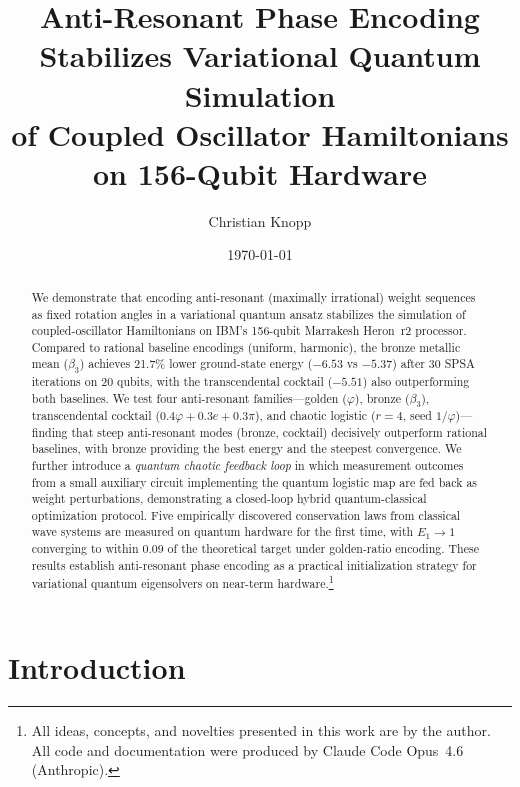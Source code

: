 \documentclass[twocolumn,showpacs,preprintnumbers,amsmath,amssymb,aps,prl]{revtex4-2}
\begin{document}

\title{Anti-Resonant Phase Encoding Stabilizes Variational Quantum Simulation\\of Coupled Oscillator Hamiltonians on 156-Qubit Hardware}

\author{Christian Knopp}

\date{\today}

\begin{abstract}
We demonstrate that encoding anti-resonant (maximally irrational) weight sequences as fixed rotation angles in a variational quantum ansatz stabilizes the simulation of coupled-oscillator Hamiltonians on IBM's 156-qubit Marrakesh Heron~r2 processor. Compared to rational baseline encodings (uniform, harmonic), the bronze metallic mean ($\beta_3$) achieves 21.7\% lower ground-state energy ($-6.53$ vs $-5.37$) after 30 SPSA iterations on 20 qubits, with the transcendental cocktail ($-5.51$) also outperforming both baselines. We test four anti-resonant families---golden ($\varphi$), bronze ($\beta_3$), transcendental cocktail ($0.4\varphi + 0.3e + 0.3\pi$), and chaotic logistic ($r\!=\!4$, seed $1/\varphi$)---finding that steep anti-resonant modes (bronze, cocktail) decisively outperform rational baselines, with bronze providing the best energy and the steepest convergence. We further introduce a \emph{quantum chaotic feedback loop} in which measurement outcomes from a small auxiliary circuit implementing the quantum logistic map are fed back as weight perturbations, demonstrating a closed-loop hybrid quantum-classical optimization protocol. Five empirically discovered conservation laws from classical wave systems are measured on quantum hardware for the first time, with $E_1 \to 1$ converging to within 0.09 of the theoretical target under golden-ratio encoding. These results establish anti-resonant phase encoding as a practical initialization strategy for variational quantum eigensolvers on near-term hardware.\footnote{All ideas, concepts, and novelties presented in this work are by the author. All code and documentation were produced by Claude Code Opus~4.6 (Anthropic).}
\end{abstract}

\maketitle

\section{Introduction}
\label{sec:intro}
\end{document}
